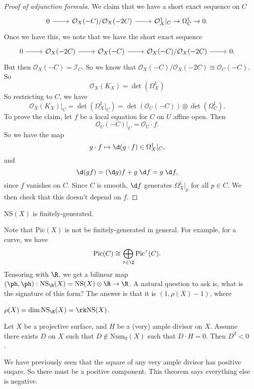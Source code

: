 \documentclass[a4paper]{article}
\newcommand\Pic{\mathrm{Pic}}
\newcommand\Num{\mathrm{Num}}
\newcommand\NS{\mathrm{NS}}
\begin{document}
\begin{proof}[Proof of adjunction formula]
  We claim that we have a short exact sequence on $C$
  \[
    \begin{tikzcd}
      0 \ar[r] & \mathcal{O}_X(-C)/\mathcal{O}_X(-2C) \ar[r] & \mathcal{O}_X^1|_C \to \Omega_C^1 \to 0.
    \end{tikzcd}
  \]
  Once we have this, we note that we have the short exact sequence
  \[
    \begin{tikzcd}
      0 \ar[r] & \mathcal{O}_X(-2C) \ar[r] & \mathcal{O}_X(-C) \ar[r] & \mathcal{O}_X(-C)/\mathcal{O}_X(-2C) \ar[r] & 0.
    \end{tikzcd}
  \]
  But then $\mathcal{O}_X(-C) = \mathcal{I}_C$. So we know that $\mathcal{O}_X(-C)/\mathcal{O}_X(-2C) \cong \mathcal{O}_C(-C)$. So
  \[
    \mathcal{O}_X(K_X) = \det(\Omega_X^1)
  \]
  So restricting to $C$, we have
  \[
    \mathcal{O}_X(K_X)|_C = \det(\Omega^1_X|_C) = \det(\mathcal{O}_C(-C)) \otimes \det(\Omega^1_C).
  \]
  To prove the claim, let $f$ be a local equation for $C$ on $U$ affine open. Then
  \[
    \mathcal{O}_U(-C)|_C = \mathcal{O}_U \cdot f.
  \]
  So we have the map
  \[
    g \cdot f \mapsto \d (g \cdot f) \in \Omega^1_X|_C,
  \]
  and
  \[
    \d (gf) = (\d g)f + g\;\d f = g\;\d f,
  \]
  since $f$ vanishes on $C$. Since $C$ is smooth, $\d f$ generates $\Omega^1_X|_p$ for all $p \in C$. We then check that this doesn't depend on $f$.
\end{proof}

\begin{fact}
  $\NS(X)$ is finitely-generated.
\end{fact}
Note that $\Pic(X)$ is not be finitely-generated in general. For example, for a curve, we have
\[
  \Pic(C) \cong \bigoplus_{\tau \in \Z} \Pic^\tau(C).
\]
Tensoring with $\R$, we get a bilinear map $(\ph, \ph): \NS_\R(X) = \NS(X)\otimes \R \to \R$. A natural question to ask is, what is the signature of this form? The answer is that it is $(1, \rho(X) - 1)$, where
\begin{defi}[$\rho(X)$]
  $\rho(X) = \dim \NS_\R(X) = \rk \NS(X)$.
\end{defi}

\begin{thm}
  Let $X$ be a projective surface, and $H$ be a (very) ample divisor on $X$. Assume there exists $D$ on $X$ such that $D \not\in \Num_0(X)$ such that $D \cdot H = 0$. Then $D^2 < 0$.
\end{thm}
We have previously seen that the square of any very ample divisor has positive suqare. So there must be a positive component. This theorem says everything else is negative.
\end{document}
